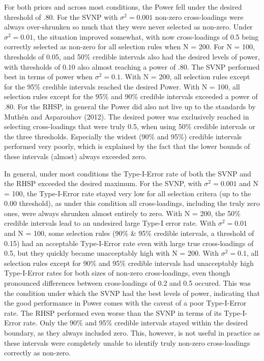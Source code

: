 \documentclass[
  man, donotrepeattitle,floatsintext]{apa6}
\begin{document}
For both priors and across most conditions, the Power fell under the desired threshold of .80. For the SVNP with \(\sigma^2 = 0.001\) non-zero cross-loadings were always over-shrunken so much that they were never selected as non-zero. Under \(\sigma^2 = 0.01\), the situation improved somewhat, with now cross-loadings of 0.5 being correctly selected as non-zero for all selection rules when N = 200. For N = 100, thresholds of 0.05, and 50\% credible intervals also had the desired levels of power, with thresholds of 0.10 also almost reaching a power of .80. The SVNP performed best in terms of power when \(\sigma^2 = 0.1\). With N = 200, all selection rules except for the 95\% credible intervals reached the desired Power. With N = 100, all selection rules except for the 95\% and 90\% credible intervals exceeded a power of .80. For the RHSP, in general the Power did also not live up to the standards by Muthén and Asparouhov (2012). The desired power was exclusively reached in selecting cross-loadings that were truly 0.5, when using 50\% credible intervals or the three thresholds. Especially the widest (90\% and 95\%) credible intervals performed very poorly, which is explained by the fact that the lower bounds of these intervals (almost) always exceeded zero.

In general, under most conditions the Type-I-Error rate of both the SVNP and the RHSP exceeded the desired maximum. For the SVNP, with \(\sigma^2 = 0.001\) and N = 100, the Type-I-Error rate stayed very low for all selection critera (up to the 0.00 threshold), as under this condition all cross-loadings, including the truly zero ones, were always shrunken almost entirely to zero. With N = 200, the 50\% credible intervals lead to an undesired large Type-I error rate. With \(\sigma^2 = 0.01\) and N = 100, some selection rules (90\% \& 95\% credible intervals, a threshold of 0.15) had an acceptable Type-I-Error rate even with large true cross-loadings of 0.5, but they quickly became unacceptably high with N = 200. With \(\sigma^2 = 0.1\), all selection rules except for 90\% and 95\% credible intervals had unacceptably high Type-I-Error rates for both sizes of non-zero cross-loadings, even though pronounced differences between cross-loadings of 0.2 and 0.5 occured. This was the condition under which the SVNP had the best levels of power, indicating that the good performance in Power comes with the caveat of a poor Type-I-Error rate. The RHSP performed even worse than the SVNP in terms of its Type-I-Error rate. Only the 90\% and 95\% credible intervals stayed within the desired boundary, as they always included zero. This, however, is not useful in practice as these intervals were completely unable to identify truly non-zero cross-loadings correctly as non-zero.
\end{document}
